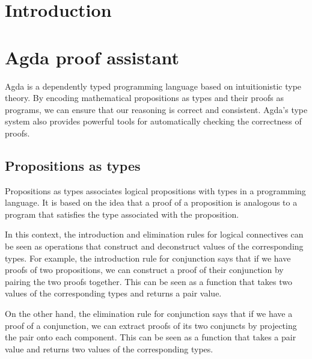 \documentclass[titlepage]{article}
\begin{document}

\begin{abstract}

\end{abstract}

\tableofcontents
\thispagestyle{empty}
\newpage
\setcounter{page}{1}



\section{Introduction}




\section{Agda proof assistant}
Agda is a dependently typed programming language based on intuitionistic type theory. By encoding mathematical propositions as types and their proofs as programs, we can ensure that our reasoning is correct and consistent. Agda's type system also provides powerful tools for automatically checking the correctness of proofs\cite{BoveDybjer2008}.

\subsection{Propositions as types}
Propositions as types associates logical propositions with types in a programming language. It is based on the idea that a proof of a proposition is analogous to a program that satisfies the type associated with the proposition.

In this context, the introduction and elimination rules for logical connectives can be seen as operations that construct and deconstruct values of the corresponding types. For example, the introduction rule for conjunction says that if we have proofs of two propositions, we can construct a proof of their conjunction by pairing the two proofs together. This can be seen as a function that takes two values of the corresponding types and returns a pair value.

On the other hand, the elimination rule for conjunction says that if we have a proof of a conjunction, we can extract proofs of its two conjuncts by projecting the pair onto each component. This can be seen as a function that takes a pair value and returns two values of the corresponding types.
\end{document}
